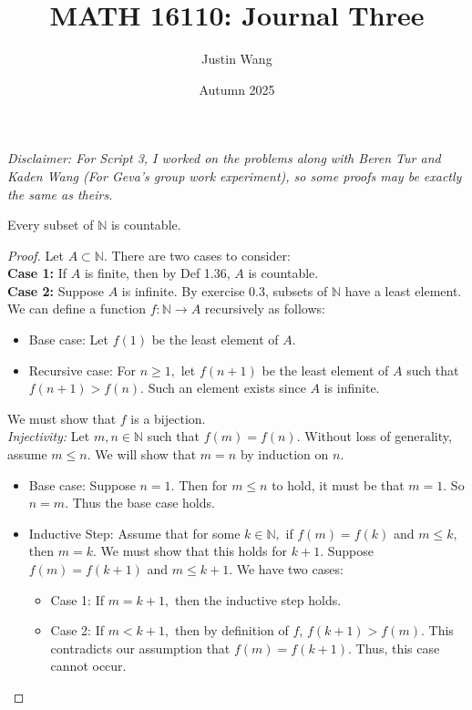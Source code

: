 \documentclass[11pt]{article}
\title{MATH 16110: Journal Three}
\author{Justin Wang}
\date{Autumn 2025}
\begin{document}
\maketitle 

\textit{Disclaimer: For Script 3, I worked on the problems along with Beren Tur and Kaden Wang (For Geva's group work experiment), so some proofs may be exactly the same as theirs. }
\begin{theorem}[1.38]
Every subset of $\mathbb{N}$ is countable.
\end{theorem}
\begin{proof}
    Let $A \subset \mathbb{N}.$ There are two cases to consider: \\
    \textbf{Case 1:} If $A$ is finite, then by Def 1.36, $A$ is countable. \\
    \textbf{Case 2:} Suppose $A$ is infinite. By exercise 0.3, subsets of $\mathbb{N}$ have a least element. 
    We can define a function $f\colon \mathbb{N} \to A$ recursively as follows:
    \begin{itemize}
        \item Base case: Let $f(1)$ be the least element of $A.$
        \item Recursive case: For $n \geq 1,$ let $f(n+1)$ be the least element of $A$ such that $f(n+1) > f(n).$ Such an element exists since $A$ is infinite.
    \end{itemize}
    We must show that $f$ is a bijection. \\
    \textit{Injectivity: } Let $m,n \in \mathbb{N}$ such that $f(m) = f(n).$ Without loss of generality, assume $m \leq n.$ We will show that $m = n$ by induction on $n.$
    \begin{itemize}
        \item Base case: Suppose $n = 1$. Then for $ m \leq n$ to hold, it must be that $m = 1$. So $n = m$. Thus the base case holds. 
        \item Inductive Step: Assume that for some $k \in \mathbb{N},$ if $f(m) = f(k)$ and $m \leq k,$ then $m = k.$ We must show that this holds for $k + 1.$ 
        Suppose $f(m) = f(k+1)$ and $m \leq k + 1.$ We have two cases:
        \begin{itemize}
            \item Case 1: If $m = k + 1,$ then the inductive step holds.
            \item Case 2: If $m < k + 1,$ then by definition of $f$, $f(k + 1) > f(m).$ This contradicts our assumption that $f(m) = f(k + 1).$ Thus, this case cannot occur.

\end{itemize}
\end{itemize}
\end{proof}
\end{document}
